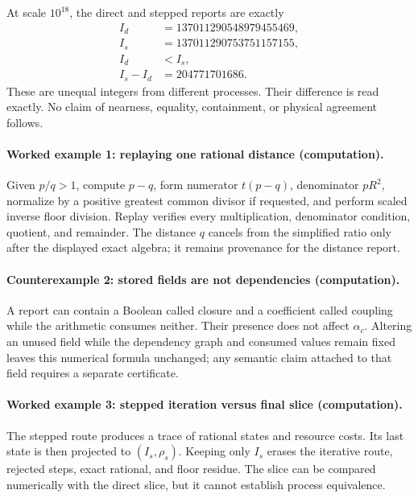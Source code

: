 At scale \(10^{18}\), the direct and stepped reports are exactly
\[
\begin{aligned}
I_d&=137011290548979455469,\\
I_s&=137011290753751157155,\\
I_d&<I_s,\\
I_s-I_d&=204771701686.
\end{aligned}
\]
These are unequal integers from different processes.  Their difference is read exactly.  No claim of nearness,
equality, containment, or physical agreement follows.

\paragraph{Worked example 1: replaying one rational distance (computation).}
Given \(p/q>1\), compute \(p-q\), form numerator \(t(p-q)\), denominator \(pR^2\), normalize by a positive greatest
common divisor if requested, and perform scaled inverse floor division.  Replay verifies every multiplication,
denominator condition, quotient, and remainder.  The distance \(q\) cancels from the simplified ratio only after the
displayed exact algebra; it remains provenance for the distance report.

\paragraph{Counterexample 2: stored fields are not dependencies (computation).}
A report can contain a Boolean called closure and a coefficient called coupling while the arithmetic consumes neither.
Their presence does not affect \(\alpha_c\).  Altering an unused field while the dependency graph and consumed values
remain fixed leaves this numerical formula unchanged; any semantic claim attached to that field requires a separate
certificate.

\paragraph{Worked example 3: stepped iteration versus final slice (computation).}
The stepped route produces a trace of rational states and resource costs.  Its last state is then projected to
\((I_s,\rho_s)\).  Keeping only \(I_s\) erases the iterative route, rejected steps, exact rational, and floor residue.
The slice can be compared numerically with the direct slice, but it cannot establish process equivalence.

